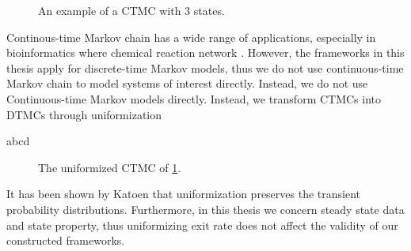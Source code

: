\begin{figure}
    \centering
    \caption{An example of a CTMC with 3 states.}
    \label{fig:ctmc}
\end{figure}
Continous-time Markov chain has a wide range of applications, especially in bioinformatics where
chemical reaction network \cite{feinberg1980chemical} \cite{anderson2011continuous}. However, the
frameworks in this thesis apply for discrete-time Markov models, thus we do not use continuous-time
Markov chain to model systems of interest directly. Instead, we do not use Continuous-time Markov
models directly. Instead, we transform CTMCs into DTMCs through uniformization \cite{katoen2016probabilistic}
\begin{definition}
    abcd
\end{definition}

\begin{figure}[H]
    \centering
    \caption{The uniformized  CTMC of \ref{fig:ctmc}.}
\end{figure}
It has been shown by Katoen \cite{katoen2013model} that uniformization preserves the transient
probability distributions. Furthermore, in this thesis we concern steady state data and state
property, thus uniformizing exit rate does not affect the validity of our constructed frameworks.

